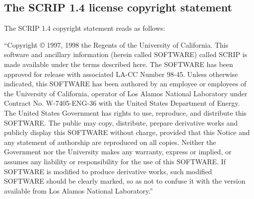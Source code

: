 \subsection{The SCRIP 1.4 license copyright statement}
\label{sec_SCRIP}

The SCRIP 1.4 copyright statement reads as follows:

``Copyright © 1997, 1998 the Regents of the University of California.
This software and ancillary information (herein called SOFTWARE)
called SCRIP is made available under the terms described here. The
SOFTWARE has been approved for release with associated LA-CC Number
98-45. Unless otherwise indicated, this SOFTWARE has been authored by
an employee or employees of the University of California, operator of
Los Alamos National Laboratory under Contract No. W-7405-ENG-36 with
the United States Department of Energy. The United States Government
has rights to use, reproduce, and distribute this SOFTWARE. The public
may copy, distribute, prepare derivative works and publicly display
this SOFTWARE without charge, provided that this Notice and any
statement of authorship are reproduced on all copies. Neither the
Government nor the University makes any warranty, express or implied,
or assumes any liability or responsibility for the use of this
SOFTWARE. If SOFTWARE is modified to produce derivative works, such
modified SOFTWARE should be clearly marked, so as not to confuse it
with the version available from Los Alamos National Laboratory.''
